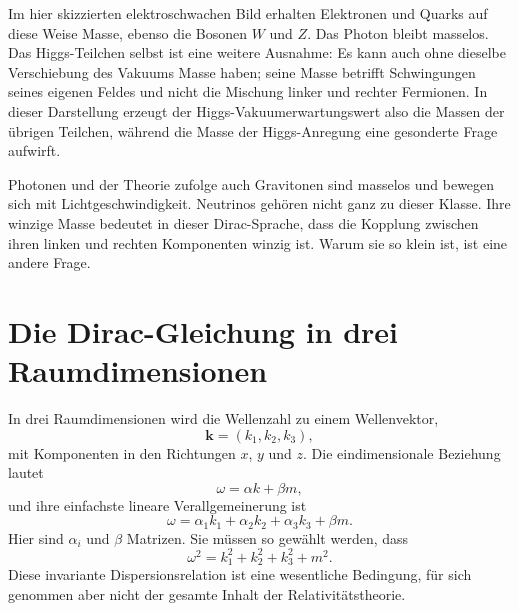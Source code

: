 Im hier skizzierten elektroschwachen Bild erhalten Elektronen und Quarks auf diese Weise Masse, ebenso die Bosonen \(W\) und \(Z\). Das Photon bleibt masselos. Das Higgs-Teilchen selbst ist eine weitere Ausnahme: Es kann auch ohne dieselbe Verschiebung des Vakuums Masse haben; seine Masse betrifft Schwingungen seines eigenen Feldes und nicht die Mischung linker und rechter Fermionen. In dieser Darstellung erzeugt der Higgs-Vakuumerwartungswert also die Massen der übrigen Teilchen, während die Masse der Higgs-Anregung eine gesonderte Frage aufwirft.

\begin{classroomqa}
\end{classroomqa}

Photonen und der Theorie zufolge auch Gravitonen sind masselos und bewegen sich mit Lichtgeschwindigkeit. Neutrinos gehören nicht ganz zu dieser Klasse. Ihre winzige Masse bedeutet in dieser Dirac-Sprache, dass die Kopplung zwischen ihren linken und rechten Komponenten winzig ist. Warum sie so klein ist, ist eine andere Frage.

\section{Die Dirac-Gleichung in drei Raumdimensionen}

In drei Raumdimensionen wird die Wellenzahl zu einem Wellenvektor,
\begin{equation}
\mathbf{k}=(k_1,k_2,k_3),
\end{equation}
mit Komponenten in den Richtungen \(x\), \(y\) und \(z\). Die eindimensionale Beziehung lautet
\begin{equation}
\omega=\alpha k+\beta m,
\end{equation}
und ihre einfachste lineare Verallgemeinerung ist
\begin{equation}
\omega
=
\alpha_1 k_1+\alpha_2 k_2+\alpha_3 k_3+\beta m.
\end{equation}
Hier sind \(\alpha_i\) und \(\beta\) Matrizen. Sie müssen so gewählt werden, dass
\begin{equation}
\omega^2=k_1^2+k_2^2+k_3^2+m^2.
\end{equation}
Diese invariante Dispersionsrelation ist eine wesentliche Bedingung, für sich genommen aber nicht der gesamte Inhalt der Relativitätstheorie.

